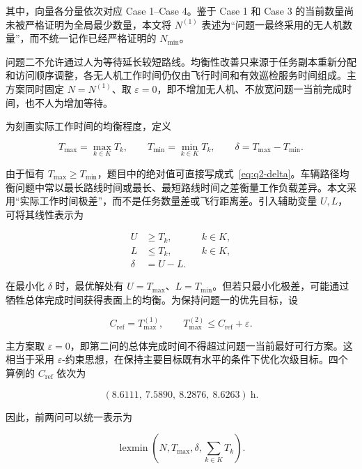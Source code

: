 \documentclass[UTF8,a4paper,12pt]{ctexart}
\numberwithin{equation}{section}
\numberwithin{equation}{section}
\begin{document}
其中，向量各分量依次对应 Case 1--Case 4。鉴于 Case 1 和 Case 3 的当前数量尚未被严格证明为全局最少数量，本文将 \(N^{(1)}\) 表述为“问题一最终采用的无人机数量”，而不统一记作已经严格证明的 \(N_{\min}\)。

问题二不允许通过人为等待延长较短路线。均衡性改善只来源于任务副本重新分配和访问顺序调整，各无人机工作时间仍仅由飞行时间和有效巡检服务时间组成。主方案同时固定 $N=N^{(1)}$、取 $\varepsilon=0$，即不增加无人机、不放宽问题一当前完成时间，也不人为增加等待。

为刻画实际工作时间的均衡程度，定义

\begin{equation}
  T_{\max}=\max_{k\in K}T_k,
  \qquad
  T_{\min}=\min_{k\in K}T_k,
  \qquad
  \delta=T_{\max}-T_{\min}.
  \label{eq:q2-delta}
\end{equation}

由于恒有 \(T_{\max}\geq T_{\min}\)，题目中的绝对值可直接写成式~\eqref{eq:q2-delta}。车辆路径均衡问题中常以最长路线时间或最长、最短路线时间之差衡量工作负载差异\cite{matl2018,lehuedepeton2020}。本文采用“实际工作时间极差”，而不是任务数量差或飞行距离差。引入辅助变量 \(U,L\)，可将其线性表示为

\begin{equation}
\begin{aligned}
  U&\geq T_k, &&k\in K,\\
  L&\leq T_k, &&k\in K,\\
  \delta&=U-L.
\end{aligned}
\label{eq:q2-balance-variables}
\end{equation}

在最小化 \(\delta\) 时，最优解处有 \(U=T_{\max}\)、\(L=T_{\min}\)。但若只最小化极差，可能通过牺牲总体完成时间获得表面上的均衡。为保持问题一的优先目标，设

\begin{equation}
  C_{\mathrm{ref}}=T_{\max}^{(1)},
  \qquad
  T_{\max}^{(2)}\leq C_{\mathrm{ref}}+\varepsilon.
  \label{eq:q2-epsilon-constraint}
\end{equation}

主方案取 \(\varepsilon=0\)，即第二问的总体完成时间不得超过问题一当前最好可行方案。这相当于采用 \(\varepsilon\)-约束思想，在保持主要目标既有水平的条件下优化次级目标\cite{mavrotas2009}。四个算例的 \(C_{\mathrm{ref}}\) 依次为

\[
  (8.6111,\ 7.5890,\ 8.2876,\ 8.6263)\ \mathrm{h}.
\]

因此，前两问可以统一表示为

\begin{equation}
  \operatorname{lexmin}
  \left(
    N,T_{\max},\delta,\sum_{k\in K}T_k
  \right).
  \label{eq:q2-overall-objective}
\end{equation}
\end{document}
